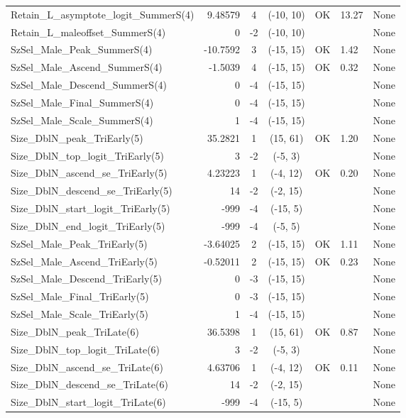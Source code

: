 \documentclass[12pt,]{article}
\begin{document}
\begin{landscape}
\begin{longtable}{lrcccll}
  Retain\_L\_asymptote\_logit\_SummerS(4) & 9.48579 & 4 & (-10, 10) & OK & 13.27 & None \\ 
  Retain\_L\_maleoffset\_SummerS(4) & 0 & -2 & (-10, 10) &  &  & None \\ 
  SzSel\_Male\_Peak\_SummerS(4) & -10.7592 & 3 & (-15, 15) & OK & 1.42 & None \\ 
  SzSel\_Male\_Ascend\_SummerS(4) & -1.5039 & 4 & (-15, 15) & OK & 0.32 & None \\ 
  SzSel\_Male\_Descend\_SummerS(4) & 0 & -4 & (-15, 15) &  &  & None \\ 
  SzSel\_Male\_Final\_SummerS(4) & 0 & -4 & (-15, 15) &  &  & None \\ 
  SzSel\_Male\_Scale\_SummerS(4) & 1 & -4 & (-15, 15) &  &  & None \\ 
  Size\_DblN\_peak\_TriEarly(5) & 35.2821 & 1 & (15, 61) & OK & 1.20 & None \\ 
  Size\_DblN\_top\_logit\_TriEarly(5) & 3 & -2 & (-5, 3) &  &  & None \\ 
  Size\_DblN\_ascend\_se\_TriEarly(5) & 4.23223 & 1 & (-4, 12) & OK & 0.20 & None \\ 
  Size\_DblN\_descend\_se\_TriEarly(5) & 14 & -2 & (-2, 15) &  &  & None \\ 
  Size\_DblN\_start\_logit\_TriEarly(5) & -999 & -4 & (-15, 5) &  &  & None \\ 
  Size\_DblN\_end\_logit\_TriEarly(5) & -999 & -4 & (-5, 5) &  &  & None \\ 
  SzSel\_Male\_Peak\_TriEarly(5) & -3.64025 & 2 & (-15, 15) & OK & 1.11 & None \\ 
  SzSel\_Male\_Ascend\_TriEarly(5) & -0.52011 & 2 & (-15, 15) & OK & 0.23 & None \\ 
  SzSel\_Male\_Descend\_TriEarly(5) & 0 & -3 & (-15, 15) &  &  & None \\ 
  SzSel\_Male\_Final\_TriEarly(5) & 0 & -3 & (-15, 15) &  &  & None \\ 
  SzSel\_Male\_Scale\_TriEarly(5) & 1 & -4 & (-15, 15) &  &  & None \\ 
  Size\_DblN\_peak\_TriLate(6) & 36.5398 & 1 & (15, 61) & OK & 0.87 & None \\ 
  Size\_DblN\_top\_logit\_TriLate(6) & 3 & -2 & (-5, 3) &  &  & None \\ 
  Size\_DblN\_ascend\_se\_TriLate(6) & 4.63706 & 1 & (-4, 12) & OK & 0.11 & None \\ 
  Size\_DblN\_descend\_se\_TriLate(6) & 14 & -2 & (-2, 15) &  &  & None \\ 
  Size\_DblN\_start\_logit\_TriLate(6) & -999 & -4 & (-15, 5) &  &  & None \\ 

\end{longtable}
\end{landscape}
\end{document}
